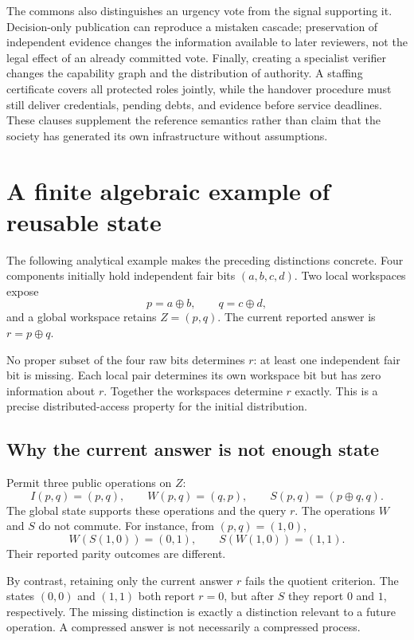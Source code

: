 \documentclass[11pt,letterpaper]{article}
\theoremstyle{plain}
\theoremstyle{definition}
\theoremstyle{remark}
\begin{document}
The commons also distinguishes an urgency vote from the signal supporting it. Decision-only publication can reproduce a mistaken cascade; preservation of independent evidence changes the information available to later reviewers, not the legal effect of an already committed vote. Finally, creating a specialist verifier changes the capability graph and the distribution of authority. A staffing certificate covers all protected roles jointly, while the handover procedure must still deliver credentials, pending debts, and evidence before service deadlines. These clauses supplement the reference semantics rather than claim that the society has generated its own infrastructure without assumptions.

\section{A finite algebraic example of reusable state}\label{sec:worked}
The following analytical example makes the preceding distinctions concrete. Four components initially hold independent fair bits $(a,b,c,d)$. Two local workspaces expose
\[
p=a\oplus b,\qquad q=c\oplus d,
\]
and a global workspace retains $Z=(p,q)$. The current reported answer is $r=p\oplus q$.

No proper subset of the four raw bits determines $r$: at least one independent fair bit is missing. Each local pair determines its own workspace bit but has zero information about $r$. Together the workspaces determine $r$ exactly. This is a precise distributed-access property for the initial distribution.

\subsection{Why the current answer is not enough state}
Permit three public operations on $Z$:
\[
I(p,q)=(p,q),\qquad W(p,q)=(q,p),\qquad S(p,q)=(p\oplus q,q).
\]
The global state supports these operations and the query $r$. The operations $W$ and $S$ do not commute. For instance, from $(p,q)=(1,0)$,
\[
W(S(1,0))=(0,1),\qquad S(W(1,0))=(1,1).
\]
Their reported parity outcomes are different.

By contrast, retaining only the current answer $r$ fails the quotient criterion. The states $(0,0)$ and $(1,1)$ both report $r=0$, but after $S$ they report $0$ and $1$, respectively. The missing distinction is exactly a distinction relevant to a future operation. A compressed answer is not necessarily a compressed process.
\end{document}
